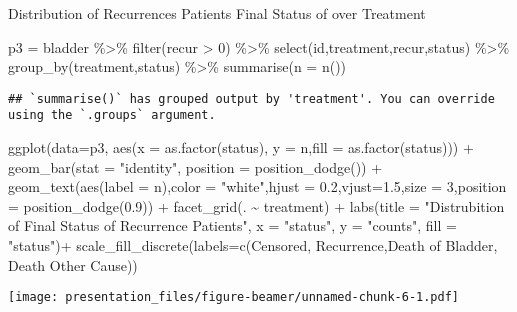 \documentclass[
  ignorenonframetext,
]{beamer}
\newenvironment{Shaded}{\begin{snugshade}}{\end{snugshade}}
\newcommand{\AttributeTok}[1]{\textcolor[rgb]{0.77,0.63,0.00}{#1}}
\newcommand{\DecValTok}[1]{\textcolor[rgb]{0.00,0.00,0.81}{#1}}
\newcommand{\FloatTok}[1]{\textcolor[rgb]{0.00,0.00,0.81}{#1}}
\newcommand{\FunctionTok}[1]{\textcolor[rgb]{0.00,0.00,0.00}{#1}}
\newcommand{\NormalTok}[1]{#1}
\newcommand{\OtherTok}[1]{\textcolor[rgb]{0.56,0.35,0.01}{#1}}
\newcommand{\SpecialCharTok}[1]{\textcolor[rgb]{0.00,0.00,0.00}{#1}}
\newcommand{\StringTok}[1]{\textcolor[rgb]{0.31,0.60,0.02}{#1}}
\begin{document}
\begin{frame}[fragile]{Distribution of Recurrences Patients Final Status
of over Treatment}
\protect\hypertarget{distribution-of-recurrences-patients-final-status-of-over-treatment}{}
\begin{Shaded}
\begin{Highlighting}[]
\NormalTok{p3 }\OtherTok{=}\NormalTok{ bladder }\SpecialCharTok{\%\textgreater{}\%} 
  \FunctionTok{filter}\NormalTok{(recur }\SpecialCharTok{\textgreater{}} \DecValTok{0}\NormalTok{) }\SpecialCharTok{\%\textgreater{}\%} 
  \FunctionTok{select}\NormalTok{(id,treatment,recur,status) }\SpecialCharTok{\%\textgreater{}\%} 
  \FunctionTok{group\_by}\NormalTok{(treatment,status) }\SpecialCharTok{\%\textgreater{}\%} \FunctionTok{summarise}\NormalTok{(}\AttributeTok{n =} \FunctionTok{n}\NormalTok{())}
\end{Highlighting}
\end{Shaded}

\begin{verbatim}
## `summarise()` has grouped output by 'treatment'. You can override using the `.groups` argument.
\end{verbatim}

\begin{Shaded}
\begin{Highlighting}[]
\FunctionTok{ggplot}\NormalTok{(}\AttributeTok{data=}\NormalTok{p3, }\FunctionTok{aes}\NormalTok{(}\AttributeTok{x =} \FunctionTok{as.factor}\NormalTok{(status), }\AttributeTok{y =}\NormalTok{ n,}\AttributeTok{fill =} \FunctionTok{as.factor}\NormalTok{(status))) }\SpecialCharTok{+} \FunctionTok{geom\_bar}\NormalTok{(}\AttributeTok{stat =} \StringTok{"identity"}\NormalTok{, }\AttributeTok{position =} \FunctionTok{position\_dodge}\NormalTok{()) }\SpecialCharTok{+} \FunctionTok{geom\_text}\NormalTok{(}\FunctionTok{aes}\NormalTok{(}\AttributeTok{label =}\NormalTok{ n),}\AttributeTok{color =} \StringTok{"white"}\NormalTok{,}\AttributeTok{hjust =} \FloatTok{0.2}\NormalTok{,}\AttributeTok{vjust=}\FloatTok{1.5}\NormalTok{,}\AttributeTok{size =} \DecValTok{3}\NormalTok{,}\AttributeTok{position =} \FunctionTok{position\_dodge}\NormalTok{(}\FloatTok{0.9}\NormalTok{)) }\SpecialCharTok{+} \FunctionTok{facet\_grid}\NormalTok{(. }\SpecialCharTok{\textasciitilde{}}\NormalTok{ treatment) }\SpecialCharTok{+} 
\FunctionTok{labs}\NormalTok{(}\AttributeTok{title =} \StringTok{"Distrubition of Final Status of Recurrence Patients"}\NormalTok{, }\AttributeTok{x =} \StringTok{"status"}\NormalTok{, }\AttributeTok{y =} \StringTok{"counts"}\NormalTok{, }\AttributeTok{fill =} \StringTok{"status"}\NormalTok{)}\SpecialCharTok{+} \FunctionTok{scale\_fill\_discrete}\NormalTok{(}\AttributeTok{labels=}\FunctionTok{c}\NormalTok{(}\StringTok{\textquotesingle{}Censored\textquotesingle{}}\NormalTok{, }\StringTok{\textquotesingle{}Recurrence\textquotesingle{}}\NormalTok{,}\StringTok{\textquotesingle{}Death of Bladder\textquotesingle{}}\NormalTok{, }\StringTok{\textquotesingle{}Death Other Cause\textquotesingle{}}\NormalTok{))}
\end{Highlighting}
\end{Shaded}

\texttt{[image: presentation\_files/figure-beamer/unnamed-chunk-6-1.pdf]}
\end{frame}
\end{document}
